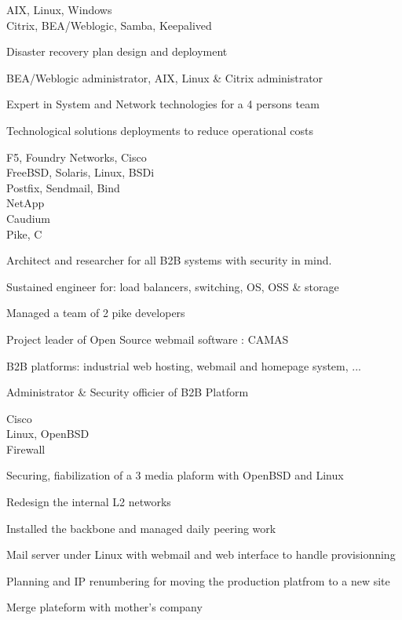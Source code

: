 \documentclass[a4paper,11pt]{cv4tw}%
\begin{document}
	{AIX, Linux, Windows\\Citrix, BEA/Weblogic, Samba, Keepalived}
		{
		\begin{missions}
			\item Disaster recovery plan design and deployment
			\item BEA/Weblogic administrator, AIX, Linux \& Citrix administrator
			\item Expert in System and Network technologies for a 4 persons team
			\item Technological solutions deployments to reduce operational costs
		\end{missions}
	}

	{F5, Foundry Networks, Cisco\\FreeBSD, Solaris, Linux, BSDi\\Postfix, Sendmail, Bind\\NetApp\\Caudium\\Pike, C}
		{
		\begin{missions}
			\item Architect and researcher for all B2B systems with security in mind.
			\item Sustained engineer for: load balancers, switching, OS, OSS \& storage
			\item Managed a team of 2 pike developers
			\item Project leader of Open Source webmail software : CAMAS
			\item B2B platforms: industrial web hosting, webmail and homepage system, ...
			\item Administrator \& Security officier of B2B Platform
		\end{missions}
	}

	{Cisco\\Linux, OpenBSD\\Firewall}
		{
		\begin{missions}
			\item Securing, fiabilization of a 3 media plaform with OpenBSD and Linux
			\item Redesign the internal L2 networks
			\item Installed the backbone and managed daily peering work
			\item Mail server under Linux with webmail and web interface to handle provisionning
			\item Planning and IP renumbering for moving the production platfrom to a new site
			\item Merge plateform with mother's company
		\end{missions}
	}
\end{document}
